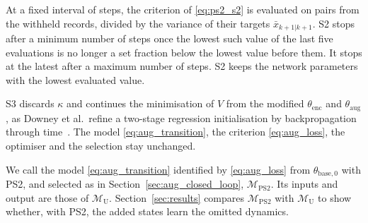At a fixed interval of steps, the criterion of \eqref{eq:ps2_s2} is evaluated
on pairs from the withheld records, divided by the variance of their targets
$\bar x_{k+1|k+1}$.
S2 stops after a minimum number of steps once the lowest such value of the
last five evaluations is no longer a set fraction below the lowest value
before them.
It stops at the latest after a maximum number of steps.
S2 keeps the network parameters with the lowest evaluated value.

S3 discards $\kappa$ and continues the minimisation of $V$ from the modified
$\theta_{\mathrm{enc}}$ and $\theta_{\mathrm{aug}}$, as Downey et al.\
refine a two-stage regression initialisation by backpropagation through
time~\cite[Sec.~4.2]{downey2017psrnn}.
The model \eqref{eq:aug_transition}, the criterion \eqref{eq:aug_loss}, the
optimiser and the selection stay unchanged.

We call the model \eqref{eq:aug_transition} identified by \eqref{eq:aug_loss}
from $\theta_{\mathrm{base},0}$ with PS2, and selected as in
Section~\ref{sec:aug_closed_loop}, $\mathcal M_{\mathrm{PS2}}$.
Its inputs and output are those of $\mathcal M_{\mathrm U}$.
Section~\ref{sec:results} compares $\mathcal M_{\mathrm{PS2}}$ with
$\mathcal M_{\mathrm U}$ to show whether, with PS2, the added states learn the
omitted dynamics.
